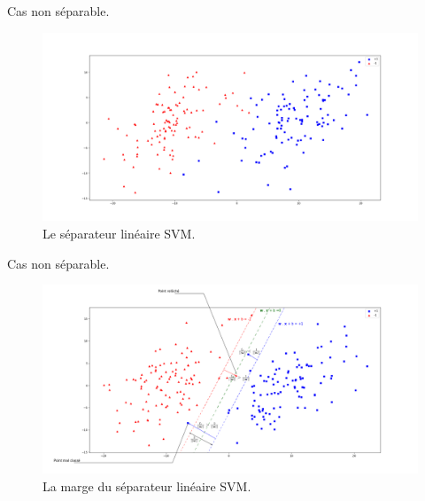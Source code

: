 \documentclass[8pt]{beamer}
\begin{document}
	\begin{frame}{Cas non séparable.}
		\begin{figure}[H]
			\includegraphics[width=\textwidth]{images/samples/non_separable}
			\caption{\label{fig::non_sep} Le séparateur linéaire SVM.}
		\end{figure}
	\end{frame}

	\begin{frame}{Cas non séparable.}
		\begin{figure}[H]
			\includegraphics[width=\textwidth]{images/samples/stable_margin}
			\caption{\label{fig::stable_margin} La marge du séparateur linéaire SVM.}
		\end{figure}
	\end{frame}
\end{document}
